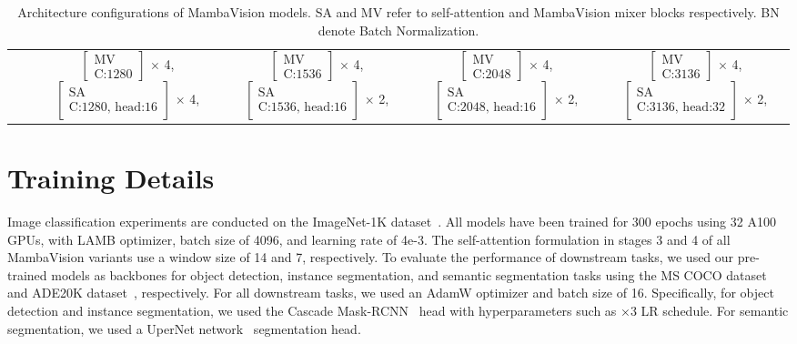 \begin{table}[t]
{\begin{tabular}{c|c|c|c|c|c}
& & $\begin{bmatrix}\text{MV}\\\text{C:1280}\end{bmatrix}$ $\times$ 4,$\begin{bmatrix}\text{SA}\\\text{C:1280, head:16}\end{bmatrix}$ $\times$ 4,   & $\begin{bmatrix}\text{MV}\\\text{C:1536}\end{bmatrix}$ $\times$ 4,$\begin{bmatrix}\text{SA}\\\text{C:1536, head:16}\end{bmatrix}$ $\times$ 2,    & $\begin{bmatrix}\text{MV}\\\text{C:2048}\end{bmatrix}$ $\times$ 4,$\begin{bmatrix}\text{SA}\\\text{C:2048, head:16}\end{bmatrix}$ $\times$ 2,   & $\begin{bmatrix}\text{MV}\\\text{C:3136}\end{bmatrix}$ $\times$ 4,$\begin{bmatrix}\text{SA}\\\text{C:3136, head:32}\end{bmatrix}$ $\times$ 2,   \\
\end{tabular}
}
\normalsize
\caption{Architecture configurations of MambaVision models. SA and MV refer to self-attention and MambaVision mixer blocks respectively. BN denote Batch Normalization.}
\label{table:arch-spec-abl}
\end{table}

\section{Training Details}
Image classification experiments are conducted on the ImageNet-1K dataset~\cite{deng2009imagenet}. All models have been trained for 300 epochs using 32 A100 GPUs, with LAMB optimizer, batch size of 4096, and learning rate of 4e-3. The self-attention formulation in stages 3 and 4 of all MambaVision variants use a window size of 14 and 7, respectively. To evaluate the performance of downstream tasks, we used our pre-trained models as backbones for object detection, instance segmentation, and semantic segmentation tasks using the MS COCO dataset~\cite{lin2014microsoft} and ADE20K dataset~\cite{zhou2017scene}, respectively. For all downstream tasks, we used an AdamW optimizer and batch size of 16. Specifically, for object detection and instance segmentation, we used the Cascade Mask-RCNN~\cite{he2017mask} head with hyperparameters such as ×3 LR schedule. For semantic segmentation, we used a UperNet network~\cite{xiao2018unified} segmentation head.

